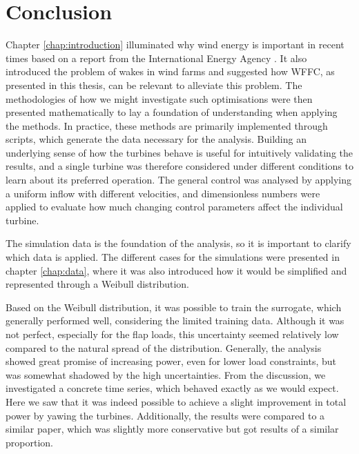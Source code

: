 \chapter{Conclusion}

Chapter \ref{chap:introduction} illuminated why wind energy is important in recent times based on a report from the International Energy Agency \cite{powerconsumption}. It also introduced the problem of wakes in wind farms and suggested how WFFC, as presented in this thesis, can be relevant to alleviate this problem. The methodologies of how we might investigate such optimisations were then presented mathematically to lay a foundation of understanding when applying the methods. In practice, these methods are primarily implemented through scripts, which generate the data necessary for the analysis. Building an underlying sense of how the turbines behave is useful for intuitively validating the results, and a single turbine was therefore considered under different conditions to learn about its preferred operation. The general control was analysed by applying a uniform inflow with different velocities, and dimensionless numbers were applied to evaluate how much changing control parameters affect the individual turbine. 

The simulation data is the foundation of the analysis, so it is important to clarify which data is applied. The different cases for the simulations were presented in chapter \ref{chap:data}, where it was also introduced how it would be simplified and represented through a Weibull distribution. 

Based on the Weibull distribution, it was possible to train the surrogate, which generally performed well, considering the limited training data. Although it was not perfect, especially for the flap loads, this uncertainty seemed relatively low compared to the natural spread of the distribution. Generally, the analysis showed great promise of increasing power, even for lower load constraints, but was somewhat shadowed by the high uncertainties. From the discussion, we investigated a concrete time series, which behaved exactly as we would expect. Here we saw that it was indeed possible to achieve a slight improvement in total power by yawing the turbines. Additionally, the results were compared to a similar paper, which was slightly more conservative but got results of a similar proportion. 

